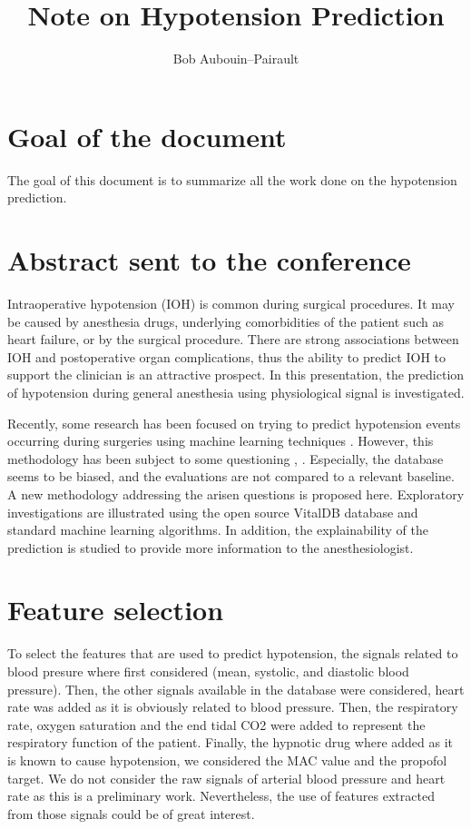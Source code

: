 \documentclass[a4paper,12pt]{article}
\begin{document}
\title{Note on Hypotension Prediction}

\author{Bob Aubouin--Pairault}
\maketitle


\section{Goal of the document}

The goal of this document is to summarize all the work done on the hypotension prediction.


\section{Abstract sent to the conference}

Intraoperative hypotension (IOH) is common during surgical procedures. It may be caused by anesthesia drugs, underlying  comorbidities of the patient such as heart failure, or by the surgical procedure. There are strong associations between IOH and postoperative organ complications, thus the ability to predict IOH to support the clinician is an attractive prospect. In this presentation, the prediction of hypotension during general anesthesia using physiological signal is investigated. \medskip

Recently, some research has been focused on trying to predict hypotension events occurring during surgeries using machine learning techniques \cite{hatibMachinelearningAlgorithmPredict2018}. However, this methodology has been subject to some questioning \cite{enevoldsenPerformanceHypotensionPrediction2022}, \cite{smithConHypotensionPrediction2023}. Especially, the database seems to be biased, and the evaluations are not compared to a relevant baseline. A new methodology addressing the arisen questions is proposed here. Exploratory investigations are illustrated using the open source VitalDB database \cite{leeVitalDBHighfidelityMultiparameter2022} and standard machine learning algorithms. In addition, the explainability of the prediction is studied to provide more information to the anesthesiologist.


\section{Feature selection}

To select the features that are used to predict hypotension, the signals related to blood presure where first considered (mean, systolic, and diastolic blood pressure). Then, the other signals available in the database were considered, heart rate was added as it is obviously related to blood pressure. Then, the respiratory rate, oxygen saturation and the end tidal CO2 were added to represent the respiratory function of the patient. Finally, the hypnotic drug where added as it is known to cause hypotension, we considered the MAC value and the propofol target. We do not consider the raw signals of arterial blood pressure and heart rate as this is a preliminary work. Nevertheless, the use of features extracted from those signals could be of great interest. \medskip
\end{document}
